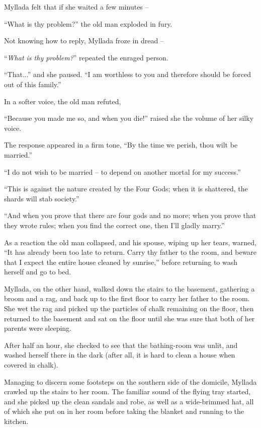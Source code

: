 Myllada felt that if she waited a few minutes --

``What is thy problem?'' the old man exploded in fury.

Not knowing how to reply, Myllada froze in dread --

``\emph{What is thy problem?}'' repeated the enraged person.

``That...'' and she paused. ``I am worthless to you and therefore should be forced out of this family.''

In a softer voice, the old man refuted,


``Because you made me so, and when you die!'' raised she the volume of her silky voice.

The response appeared in a firm tone, ``By the time we perish, thou wilt be married.''

``I do not wish to be married -- to depend on another mortal for my success.''

``This is against the nature created by the Four Gods; when it is shattered, the shards will stab society.''

``And when you prove that there are four gods and no more; when you prove that they wrote rules; when you find the correct one, then I'll gladly marry.''

As a reaction the old man collapsed, and his spouse, wiping up her tears, warned, ``It has already been too late to return. Carry thy father to the room, and beware that I expect the entire house cleaned by sunrise,'' before returning to wash herself and go to bed.

Myllada, on the other hand, walked down the stairs to the basement, gathering a broom and a rag, and back up to the first floor to carry her father to the room. She wet the rag and picked up the particles of chalk remaining on the floor, then returned to the basement and sat on the floor until she was sure that both of her parents were sleeping.

After half an hour, she checked to see that the bathing-room was unlit, and washed herself there in the dark (after all, it is hard to clean a house when covered in chalk).

Managing to discern some footsteps on the southern side of the domicile, Myllada crawled up the stairs to her room. The familiar sound of the flying tray started, and she picked up the clean sandals and robe, as well as a wide-brimmed hat, all of which she put on in her room before taking the blanket and running to the kitchen.

